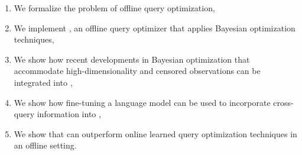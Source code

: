 


\begin{enumerate}[leftmargin=*]
    \item We formalize the problem of offline query optimization,
    \item We implement \sysname, an offline query optimizer that applies Bayesian optimization techniques,
    \item We show  how recent developments in Bayesian optimization that accommodate high-dimensionality and censored observations can be integrated into \sysname,
    \item We show how fine-tuning a language model can be used to incorporate cross-query information into \sysname,
    \item We show that \sysname can outperform online learned query optimization techniques in an offline setting.
\end{enumerate}
